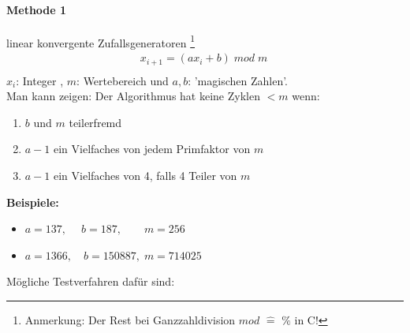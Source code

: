 \documentclass[12pt]{article}
\begin{document}
\paragraph{Methode 1} 

linear konvergente Zufallsgeneratoren \footnote{Anmerkung: Der Rest bei Ganzzahldivision $mod$ $\widehat{=}$ $\% $ in C!} 
\begin{align}
& x_{i+1}= (a x_i + b)\; mod \; m \quad \\
\end{align}
 $x_i$: Integer ,  $m$: Wertebereich und $a,b$: 'magischen Zahlen'. \\
Man kann zeigen: Der Algorithmus hat keine Zyklen $< m$ wenn:
\begin{enumerate}
\item $b$ und $m$ teilerfremd
\item $a-1$ ein Vielfaches von jedem Primfaktor von $m$
\item $a-1$ ein Vielfaches von 4, falls 4 Teiler von $m$
\end{enumerate}
\textbf{Beispiele:} \begin{itemize}
\item $a= 137, \; \quad b= 187, \quad \quad m=256$
\item $ a= 1366, \quad b=150887, \; m=714025$
\end{itemize}
Mögliche Testverfahren dafür sind:
\end{document}
